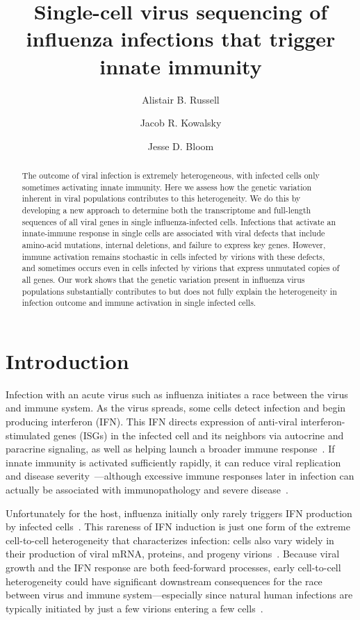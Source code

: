 \documentclass[9pt,lineno]{template}
\title{Single-cell virus sequencing of influenza infections that trigger innate immunity}
\author[1]{Alistair B. Russell}
\author[1]{Jacob R. Kowalsky}
\author[1,2,3*]{Jesse D. Bloom}
\affil[1]{Basic Sciences Division and Computational Biology Program, Fred Hutchinson Cancer Research Center, Seattle, United States}
\affil[2]{Department of Genome Sciences, University of Washington, Seattle, United States}
\affil[3]{Howard Hughes Medical Institute, Fred Hutchinson Cancer Research Center, Seattle, United States}
\begin{document}
\maketitle

\begin{abstract}
The outcome of viral infection is extremely heterogeneous, with infected cells only sometimes activating innate immunity.  
Here we assess how the genetic variation inherent in viral populations contributes to this heterogeneity.
We do this by developing a new approach to determine both the transcriptome and full-length sequences of all viral genes in single influenza-infected cells.
Infections that activate an innate-immune response in single cells are associated with viral defects that include amino-acid mutations, internal deletions, and failure to express key genes.  
However, immune activation remains stochastic in cells infected by virions with these defects, and sometimes occurs even in cells infected by virions that express unmutated copies of all genes.
Our work shows that the genetic variation present in influenza virus populations substantially contributes to but does not fully explain the heterogeneity in infection outcome and immune activation in single infected cells.
\end{abstract}


\section{Introduction}
Infection with an acute virus such as influenza initiates a race between the virus and immune system.
As the virus spreads, some cells detect infection and begin producing interferon (IFN).
This IFN directs expression of anti-viral interferon-stimulated genes (ISGs) in the infected cell and its neighbors via autocrine and paracrine signaling, as well as helping launch a broader immune response~\citep{stetson2006type,honda2006type}.
If innate immunity is activated sufficiently rapidly, it can reduce viral replication and disease severity~\citep{solov1969results,treanor1987intranasally,beilharz2007protection,kugel2009intranasal,steel2010transmission}---although excessive immune responses later in infection can actually be associated with immunopathology and severe disease~\citep{la2007question, iwasaki2014innate}.

Unfortunately for the host, influenza initially only rarely triggers IFN production by infected cells~\citep{kallfass2013visualizing, killip2017single}.
This rareness of IFN induction is just one form of the extreme cell-to-cell heterogeneity that characterizes infection: cells also vary widely in their production of viral mRNA, proteins, and progeny virions~\citep{russell2018extreme,steuerman2018dissection,sjaastad2018distinct,heldt2015single}.
Because viral growth and the IFN response are both feed-forward processes, early cell-to-cell heterogeneity could have significant downstream consequences for the race between virus and immune system---especially since natural human infections are typically initiated by just a few virions entering a few cells~\citep{mccrone2018stochastic, xue2018reconciling, varble2014influenza}.
\end{document}
